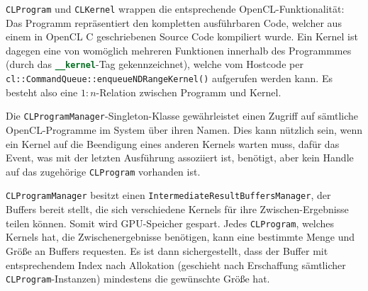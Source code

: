 	\lstinline|CLProgram| und \lstinline|CLKernel| wrappen die entsprechende OpenCL-Funktionalität:
	Das Programm repräsentiert den kompletten ausführbaren Code, welcher aus einem in OpenCL C geschriebenen
	Source Code kompiliert wurde. Ein Kernel ist dagegen eine von womöglich mehreren Funktionen innerhalb
	des Programmmes (durch das \lstinline[language=OpenCL]|__kernel|-Tag gekennzeichnet),
	welche vom Hostcode per \lstinline|cl::CommandQueue::enqueueNDRangeKernel()| aufgerufen werden kann.
	Es besteht also eine $1:n$-Relation zwischen Programm und Kernel.
	
	Die \lstinline|CLProgramManager|-Singleton-Klasse gewährleistet einen Zugriff auf sämtliche OpenCL-Programme
	im System über ihren Namen. Dies kann nützlich sein, wenn ein Kernel auf die Beendigung eines anderen Kernels
	warten muss, dafür das Event, was mit der letzten Ausführung assoziiert ist, benötigt, aber kein Handle auf das 
	zugehörige \lstinline|CLProgram| vorhanden ist.
	
	\lstinline|CLProgramManager| besitzt einen \lstinline|IntermediateResultBuffersManager|, der Buffers bereit stellt,
	die sich verschiedene Kernels für ihre Zwischen-Ergebnisse teilen können. Somit wird GPU-Speicher gespart.
	Jedes \lstinline|CLProgram|, welches Kernels hat, die Zwischenergebnisse benötigen, kann eine bestimmte Menge
	und Größe an Buffers requesten. Es ist dann sichergestellt, dass der Buffer mit entsprechendem Index nach 
	Allokation (geschieht nach Erschaffung sämtlicher \lstinline|CLProgram|-Instanzen) mindestens die
	gewünschte Größe hat.
	 
	
		
